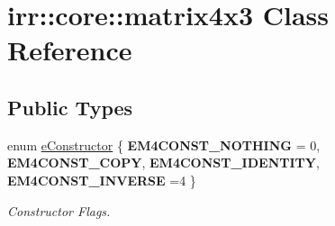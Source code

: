 \hypertarget{classirr_1_1core_1_1matrix4x3}{}\section{irr\+:\+:core\+:\+:matrix4x3 Class Reference}
\label{classirr_1_1core_1_1matrix4x3}
\subsection*{Public Types}
\begin{DoxyCompactItemize}
\item 
enum \hyperlink{classirr_1_1core_1_1matrix4x3_a71900f0a319758c8bd685289aafcf4d7}{e\+Constructor} \{ {\bfseries E\+M4\+C\+O\+N\+S\+T\+\_\+\+N\+O\+T\+H\+I\+NG} = 0, 
{\bfseries E\+M4\+C\+O\+N\+S\+T\+\_\+\+C\+O\+PY}, 
{\bfseries E\+M4\+C\+O\+N\+S\+T\+\_\+\+I\+D\+E\+N\+T\+I\+TY}, 
{\bfseries E\+M4\+C\+O\+N\+S\+T\+\_\+\+I\+N\+V\+E\+R\+SE} =4
 \}\hypertarget{classirr_1_1core_1_1matrix4x3_a71900f0a319758c8bd685289aafcf4d7}{}\label{classirr_1_1core_1_1matrix4x3_a71900f0a319758c8bd685289aafcf4d7}
\begin{DoxyCompactList}\small\item\em Constructor Flags. \end{DoxyCompactList}
\end{DoxyCompactItemize}
